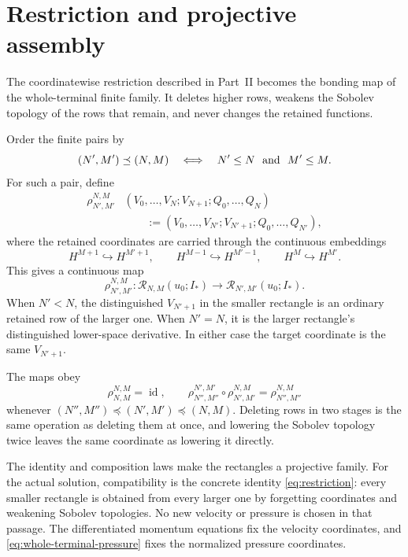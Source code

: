\section{Restriction and projective assembly}

The coordinatewise restriction described in Part~II becomes the bonding map
of the whole-terminal finite family.  It deletes higher rows, weakens the
Sobolev topology of the rows that remain, and never changes the retained
functions.

Order the finite pairs by
\[
 (N',M')\preceq(N,M)
 \quad\Longleftrightarrow\quad
 N'\le N\ \hbox{ and }\ M'\le M.
\]
For such a pair, define
\begin{align*}
 \rho_{N',M'}^{N,M}
 &(V_0,\ldots,V_N;V_{N+1};Q_0,\ldots,Q_N)
 \\
 &\qquad:=
 (V_0,\ldots,V_{N'};V_{N'+1};Q_0,\ldots,Q_{N'}),
\end{align*}
where the retained coordinates are carried through the continuous embeddings
\begin{equation*}
 H^{M+1}\hookrightarrow H^{M'+1},
 \qquad
 H^{M-1}\hookrightarrow H^{M'-1},
 \qquad
 H^M\hookrightarrow H^{M'}.
\end{equation*}
This gives a continuous map
\[
 \rho_{N',M'}^{N,M}:
 \mathscr R_{N,M}(u_0;I_*)
 \longrightarrow
 \mathscr R_{N',M'}(u_0;I_*).
\]
When \(N'<N\), the distinguished \(V_{N'+1}\) in the smaller rectangle is an
ordinary retained row of the larger one.  When \(N'=N\), it is the larger
rectangle's distinguished lower-space derivative.  In either case the target
coordinate is the same \(V_{N'+1}\).

The maps obey
\begin{equation*}
 \rho_{N,M}^{N,M}=\operatorname{id},
 \qquad
 \rho_{N'',M''}^{N',M'}\circ\rho_{N',M'}^{N,M}
 =\rho_{N'',M''}^{N,M}
\end{equation*}
whenever
\((N'',M'')\preceq(N',M')\preceq(N,M)\).  Deleting rows in two stages is
the same operation as deleting them at once, and lowering the Sobolev topology
twice leaves the same coordinate as lowering it directly.

The identity and composition laws make the rectangles a projective family.
For the actual solution, compatibility is the concrete identity
\eqref{eq:restriction}: every smaller rectangle is obtained from every larger
one by forgetting coordinates and weakening Sobolev topologies.  No new
velocity or pressure is chosen in that passage.  The differentiated momentum
equations fix the velocity coordinates, and
\eqref{eq:whole-terminal-pressure} fixes the normalized pressure coordinates.

